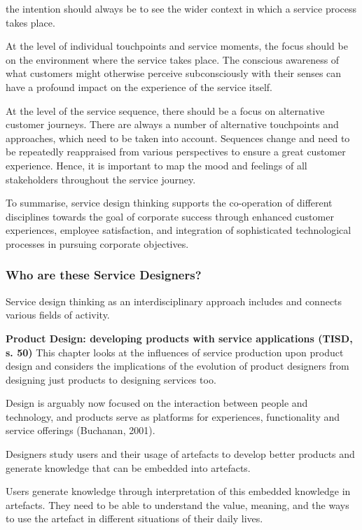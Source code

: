 the intention should always be to see the wider context in which a service process takes place.

At the level of individual touchpoints and service moments, the focus should be on the environment where the service takes place. The conscious awareness of what customers might otherwise perceive subconsciously with their senses can have a profound impact on the experience of the service itself.

At the level of the service sequence, there should be a focus on alternative customer journeys. There are always a number of alternative touchpoints and approaches, which need to be taken into account. Sequences change and need to be repeatedly reappraised from various perspectives to ensure a great customer experience. Hence, it is important to map the mood and feelings of all stakeholders throughout the service journey.

To summarise, service design thinking supports the co-operation of different disciplines towards the goal of corporate success through enhanced customer experiences, employee satisfaction, and integration of sophisticated technological processes in pursuing corporate objectives.

\subsubsection{Who are these Service Designers?}

Service design thinking as an interdisciplinary approach includes and connects various fields of activity.

\textbf{Product Design: developing products with service applications (TISD, s. 50)}
This chapter looks at the influences of service production upon product design and considers the implications of the evolution of product designers from designing just products to designing services too.

Design is arguably now focused on the interaction between people and technology, and products serve as platforms for experiences, functionality and service offerings (Buchanan, 2001).

Designers study users and their usage of artefacts to develop better products and generate knowledge that can be embedded into artefacts.

Users generate knowledge through interpretation of this embedded knowledge in artefacts. They need to be able to understand the value, meaning, and the ways to use the artefact in different situations of their daily lives.

